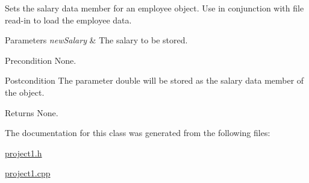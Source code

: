 Sets the salary data member for an employee object. Use in conjunction with file read-\/in to load the employee data. 
\begin{DoxyParams}{Parameters}
{\em new\-Salary} & The salary to be stored. \\
\hline
\end{DoxyParams}
\begin{DoxyPrecond}{Precondition}
None. 
\end{DoxyPrecond}
\begin{DoxyPostcond}{Postcondition}
The parameter double will be stored as the salary data member of the object. 
\end{DoxyPostcond}
\begin{DoxyReturn}{Returns}
None. 
\end{DoxyReturn}


The documentation for this class was generated from the following files\-:\begin{DoxyCompactItemize}
\item 
\hyperlink{project1_8h}{project1.\-h}\item 
\hyperlink{project1_8cpp}{project1.\-cpp}\end{DoxyCompactItemize}
